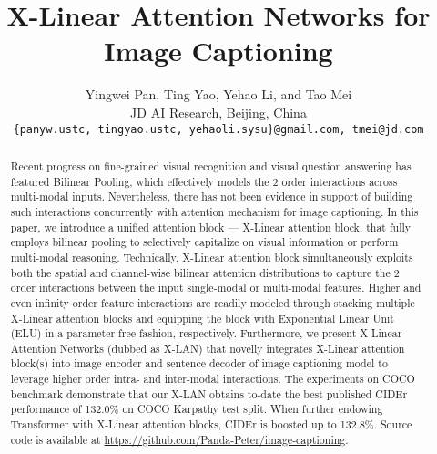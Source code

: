 \documentclass[10pt,twocolumn,letterpaper]{article}
\begin{document}
\title{X-Linear Attention Networks for Image Captioning}

\author{Yingwei Pan, Ting Yao, Yehao Li, and Tao Mei \\
{\normalsize\centering JD AI Research, Beijing, China}\\
{\tt\small \{panyw.ustc, tingyao.ustc, yehaoli.sysu\}@gmail.com, tmei@jd.com}
}



\maketitle
\thispagestyle{empty}



\begin{abstract}
Recent progress on fine-grained visual recognition and visual question answering has featured Bilinear Pooling, which effectively models the 2 order interactions across multi-modal inputs. Nevertheless, there has not been evidence in support of building such interactions concurrently with attention mechanism for image captioning. In this paper, we introduce a unified attention block --- X-Linear attention block, that fully employs bilinear pooling to selectively capitalize on visual information or perform multi-modal reasoning. Technically, X-Linear attention block simultaneously exploits both the spatial and channel-wise bilinear attention distributions to capture the 2 order interactions between the input single-modal or multi-modal features. Higher and even infinity order feature interactions are readily modeled through stacking multiple X-Linear attention blocks and equipping the block with Exponential Linear Unit (ELU) in a parameter-free fashion, respectively. Furthermore, we present X-Linear Attention Networks (dubbed as X-LAN) that novelly integrates X-Linear attention block(s) into image encoder and sentence decoder of image captioning model to leverage higher order intra- and inter-modal interactions. The experiments on COCO benchmark demonstrate that our X-LAN obtains to-date the best published CIDEr performance of 132.0\% on COCO Karpathy test split. When further endowing Transformer with X-Linear attention blocks, CIDEr is boosted up to 132.8\%. Source code is available at \url{https://github.com/Panda-Peter/image-captioning}.
\end{abstract}
\end{document}
